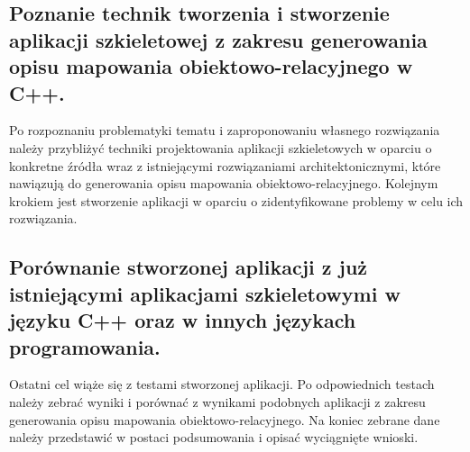 \documentclass[12pt]{report}
\begin{document}
\subsection{Poznanie technik tworzenia i stworzenie aplikacji szkieletowej z zakresu generowania opisu mapowania obiektowo-relacyjnego w C++.}
Po rozpoznaniu problematyki tematu i zaproponowaniu własnego rozwiązania należy przybliżyć techniki projektowania aplikacji szkieletowych w oparciu o konkretne źródła wraz z istniejącymi rozwiązaniami architektonicznymi, które nawiązują do generowania opisu mapowania obiektowo-relacyjnego. Kolejnym krokiem jest stworzenie aplikacji w oparciu o zidentyfikowane problemy w celu ich rozwiązania. 
\subsection{Porównanie stworzonej aplikacji z już istniejącymi aplikacjami szkieletowymi w języku C++ oraz w innych językach programowania.}
Ostatni cel wiąże się z testami stworzonej aplikacji. Po odpowiednich testach należy zebrać wyniki i porównać z wynikami podobnych aplikacji z zakresu generowania opisu mapowania obiektowo-relacyjnego. Na koniec zebrane dane należy przedstawić w postaci podsumowania i opisać wyciągnięte wnioski.
\end{document}
